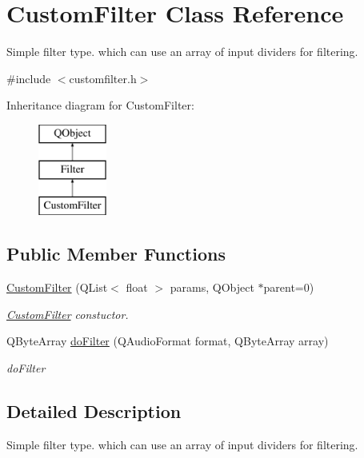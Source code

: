 \hypertarget{class_custom_filter}{}\section{Custom\+Filter Class Reference}
\label{class_custom_filter}


Simple filter type. which can use an array of input dividers for filtering.  




{\ttfamily \#include $<$customfilter.\+h$>$}

Inheritance diagram for Custom\+Filter\+:\begin{figure}[H]
\begin{center}
\leavevmode
\includegraphics[height=3.000000cm]{class_custom_filter}
\end{center}
\end{figure}
\subsection*{Public Member Functions}
\begin{DoxyCompactItemize}
\item 
\hyperlink{class_custom_filter_aea563fa1531896e1e6427c42e8694ecf}{Custom\+Filter} (Q\+List$<$ float $>$ params, Q\+Object $\ast$parent=0)
\begin{DoxyCompactList}\small\item\em \hyperlink{class_custom_filter}{Custom\+Filter} constuctor. \end{DoxyCompactList}\item 
Q\+Byte\+Array \hyperlink{class_custom_filter_aafa4ccbab26275b5ef223158cbb684ab}{do\+Filter} (Q\+Audio\+Format format, Q\+Byte\+Array array)
\begin{DoxyCompactList}\small\item\em do\+Filter \end{DoxyCompactList}\end{DoxyCompactItemize}


\subsection{Detailed Description}
Simple filter type. which can use an array of input dividers for filtering. 

